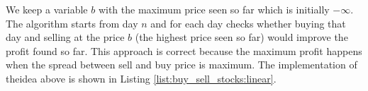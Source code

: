 We keep a variable $b$ with the maximum price seen so far which is initially $-\infty$. The algorithm starts from day $n$ and for each day checks whether buying that day and selling at the price $b$ (the highest price seen so far) would improve the profit found so far. This approach is correct because the maximum profit happens when the spread between sell and buy price is maximum.
The implementation of theidea above is shown in Listing \ref{list:buy_sell_stocks:linear}.



